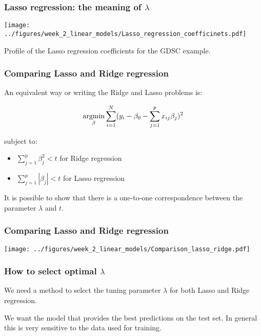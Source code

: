\documentclass[notes]{beamer}          %
\newcommand{\argmin}{\operatornamewithlimits{argmin}}
\begin{document}
\begin{frame}
\frametitle{Lasso regression: the meaning of $\lambda$}

\begin{center}
\texttt{[image: ../figures/week\_2\_linear\_models/Lasso\_regression\_coefficinets.pdf]}
\end{center}

Profile of the Lasso regression coefficients for the GDSC example.

\end{frame}

\begin{frame}
\frametitle{Comparing Lasso and Ridge regression}

An equivalent way or writing the Ridge and Lasso problems is:

\begin{equation*}
    \argmin_{\beta} \sum_{i=1}^N (y_i - \beta_0 -  \sum_{j=1}^p x_{ij}\beta_j)^2
\end{equation*}

subject to: 
\begin{itemize}
    \item $\sum_{j=1}^p \beta_j^2 < t$ for Ridge regression
    \item $\sum_{j=1}^p | \beta_j | < t$ for Lasso regression
\end{itemize}

\vspace{5mm} 

It is possible to show that there is a one-to-one correspondence between the parameter $\lambda$ and $t$.

\end{frame}


\begin{frame}
\frametitle{Comparing Lasso and Ridge regression}

\begin{center}
\texttt{[image: ../figures/week\_2\_linear\_models/Comparison\_lasso\_ridge.pdf]}
\end{center}

\end{frame}


\begin{frame}
\frametitle{How to select optimal $\lambda$}

We need a method to select the tuning parameter $\lambda$ for both Lasso and Ridge regression.

\vspace{5mm} 

We want the model that provides the best predictions on the test set. In general this is very sensitive to the data used for training.
\end{frame}
\end{document}
